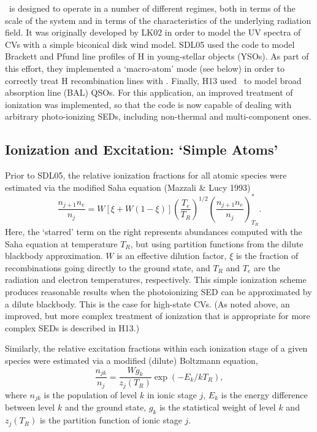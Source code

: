 \documentclass[preprint, a4paper, 11pt]{aastex}
\begin{document}
\py\ is designed to operate in a number of different
regimes, both in terms of the scale of the system and in terms of the
characteristics of the underlying radiation field.
It was originally developed by LK02 in order to model the UV spectra
of CVs with a simple biconical disk wind model. SDL05
\nocite{simmacro2005} used the code to model Brackett
and Pfund line profiles of H in young-stellar objects (YSOs). As part
of this effort, they implemented a `macro-atom' mode (see below) in
order to correctly treat H recombination lines with
\py. Finally, H13 used \py\ to model broad absorption line (BAL) QSOs. For
this application, an improved treatment of ionization was implemented,
so that the code is now capable of dealing with arbitrary
photo-ionizing SEDs, including non-thermal and multi-component ones. 

\subsection{Ionization and Excitation: `Simple Atoms'}
\label{simpleatoms}

Prior to SDL05, the relative ionization fractions for all atomic
species were estimated via the modified Saha equation (Mazzali \&
Lucy 1993)  
\begin{equation}
\frac{n_{j+1} n_e}{n_j} = W [\xi + W(1-\xi)]
\left(\frac{T_e}{T_R}\right)^{1/2}
\left(\frac{n_{j+1}n_e}{n_j}\right)^*_{T_R}. \label{ionization}
\end{equation}
Here, the `starred' term on the right represents abundances computed with
the Saha equation at temperature $T_R$, but using partition functions
from the dilute blackbody approximation. 
$W$ is an effective dilution factor, $\xi$ is the
fraction of recombinations going directly to the ground state, and
$T_R$ and $T_e$ are the radiation and electron temperatures,
respectively. This simple ionization scheme produces reasonable
results when the photoionizing SED can be approximated by a dilute
blackbody. This is the case for high-state CVs. (As noted above, an
improved, but more complex treatment of ionization that is appropriate
for more complex SEDs is described in H13.) 

Similarly, the relative excitation fractions within each ionization
stage of a given species were estimated via a modified (dilute) Boltzmann
equation,
\begin{equation}
\frac{n_{jk}}{n_j} = \frac{W g_k}{z_j(T_R)} \exp(-E_k/kT_R),
\end{equation}
where $n_{jk}$ is the population of level $k$ in ionic stage $j$,
$E_k$ is the energy difference between level $k$ and the ground state,
$g_k$ is the statistical weight of level $k$
and $z_j(T_R)$ is the partition function of ionic stage $j$. 
\end{document}
